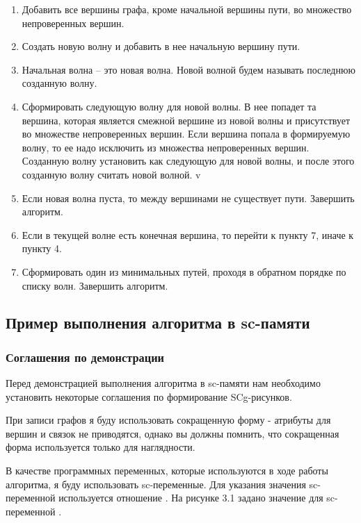 \begin{enumerate}
\item Добавить все вершины графа, кроме начальной вершины пути, во
  множество непроверенных вершин.
\item Создать новую волну и добавить в нее начальную вершину пути.
\item Начальная волна – это новая волна. Новой волной будем называть
  последнюю созданную волну.
\item Сформировать следующую волну для новой волны. В нее попадет та
  вершина, которая является смежной вершине из новой волны и
  присутствует во множестве непроверенных вершин. Если вершина попала
  в формируемую волну, то ее надо исключить из множества непроверенных
  вершин. Созданную волну установить как следующую для новой волны, и
  после этого созданную волну считать новой волной.
v\item Если новая волна пуста, то между вершинами не существует
  пути. Завершить алгоритм.
\item Если в текущей волне есть конечная вершина, то перейти к пункту
  7, иначе к пункту 4.
\item Сформировать один из минимальных путей, проходя в обратном
  порядке по списку волн. Завершить алгоритм.
\end{enumerate}

\subsection{Пример выполнения алгоритма в sc-памяти}
\label{sec:algodemo_example}

\subsubsection{Соглашения по демонстрации}
\label{sec:algodemo_demo_conv}

Перед демонстрацией выполнения алгоритма в sc-памяти нам необходимо
установить некоторые соглашения по формирование SCg-рисунков.

При записи графов я буду использовать сокращенную форму - атрибуты для
вершин и связок не приводятся, однако вы должны помнить, что
сокращенная форма используется только для наглядности.

В качестве программных переменных, которые используются в ходе работы
алгоритма, я буду использовать sc-переменные. Для указания значения
sc-переменной используется отношение .  На рисунке 3.1
задано значение для sc-переменной .

